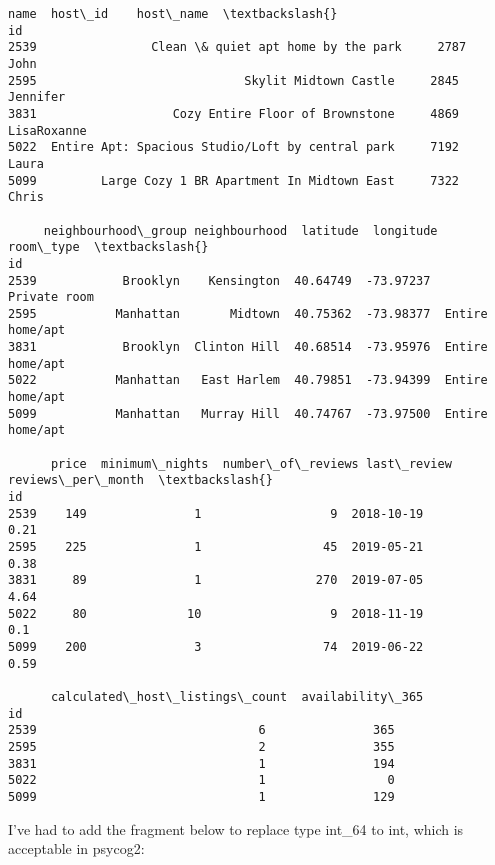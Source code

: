 \documentclass[11pt]{article}
\makeatletter
\newcommand{\boxspacing}{\kern\kvtcb@left@rule\kern\kvtcb@boxsep}
\newcommand{\prompt}[4]{
        \ttfamily\llap{{\color{#2}[#3]:\hspace{3pt}#4}}\vspace{-\baselineskip}
    }
\makeatother
\begin{document}
            \begin{tcolorbox}[breakable, size=fbox, boxrule=.5pt, pad at break*=1mm, opacityfill=0]
\prompt{Out}{outcolor}{7}{\boxspacing}
\begin{Verbatim}[commandchars=\\\{\}]
                                                  name  host\_id    host\_name  \textbackslash{}
id
2539                Clean \& quiet apt home by the park     2787         John
2595                             Skylit Midtown Castle     2845     Jennifer
3831                   Cozy Entire Floor of Brownstone     4869  LisaRoxanne
5022  Entire Apt: Spacious Studio/Loft by central park     7192        Laura
5099         Large Cozy 1 BR Apartment In Midtown East     7322        Chris

     neighbourhood\_group neighbourhood  latitude  longitude        room\_type  \textbackslash{}
id
2539            Brooklyn    Kensington  40.64749  -73.97237     Private room
2595           Manhattan       Midtown  40.75362  -73.98377  Entire home/apt
3831            Brooklyn  Clinton Hill  40.68514  -73.95976  Entire home/apt
5022           Manhattan   East Harlem  40.79851  -73.94399  Entire home/apt
5099           Manhattan   Murray Hill  40.74767  -73.97500  Entire home/apt

      price  minimum\_nights  number\_of\_reviews last\_review reviews\_per\_month  \textbackslash{}
id
2539    149               1                  9  2018-10-19              0.21
2595    225               1                 45  2019-05-21              0.38
3831     89               1                270  2019-07-05              4.64
5022     80              10                  9  2018-11-19               0.1
5099    200               3                 74  2019-06-22              0.59

      calculated\_host\_listings\_count  availability\_365
id
2539                               6               365
2595                               2               355
3831                               1               194
5022                               1                 0
5099                               1               129
\end{Verbatim}
\end{tcolorbox}
        
    I've had to add the fragment below to replace type int\_64 to int, which
is acceptable in psycog2:
\end{document}
